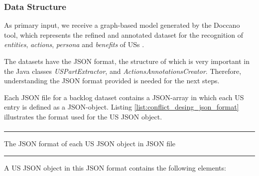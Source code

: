\subsubsection*{Data Structure}\label{conflict_design_step_0}
As primary input, we receive a graph-based model generated by the Doccano tool, which represents the refined and annotated dataset for the recognition of \emph{entities}, \emph{actions}, \emph{persona} and \emph{benefits} of USs \cite{arulmohan2023extracting}.

The datasets have the JSON format, the structure of which is very important in the Java classes \textit{USPartExtractor}, and \textit{ActionsAnnotationsCreator}. Therefore, understanding the JSON format provided is needed for the next steps.

Each JSON file for a backlog dataset contains a JSON-array in which each US entry is defined as a JSON-object. Listing \ref{list:conflict_desing_json_format} illustrates the format used for the US JSON object.
\begin{MyListing}
	\paragraph{}
	\hrule
	\centering
	
	\caption{The JSON format of each US JSON object in JSON file}\label{list:conflict_desing_json_format}
	\hrule
\end{MyListing}
A US JSON object in this JSON format contains the following elements:
